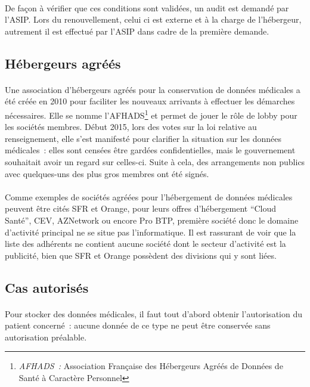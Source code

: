 \paragraph{}
De façon à vérifier que ces conditions sont validées, un audit est demandé par
l'ASIP\@. Lors du renouvellement, celui ci est externe et à la charge de
l'hébergeur, autrement il est effectué par l'ASIP dans cadre de la première
demande.


        \subsection{Hébergeurs agréés}

\paragraph{}
Une association d'hébergeurs agréés pour la conservation de données médicales a
été créée en 2010 pour faciliter les nouveaux arrivants à effectuer les
démarches nécessaires. Elle se nomme l'AFHADS\footnote{\emph{AFHADS~: }
Association Française des Hébergeurs Agréés de Données de Santé à Caractère
Personnel} et permet de jouer le rôle de lobby pour les sociétés membres. Début
2015, lors des votes sur la loi relative au renseignement, elle s'est manifesté
pour clarifier la situation sur les données médicales~: elles sont censées être
gardées confidentielles, mais le gouvernement souhaitait avoir un regard sur
celles-ci. Suite à cela, des arrangements non publics avec quelques-uns des
plus gros membres ont été signés.

\paragraph{}
Comme exemples de sociétés agréées pour l'hébergement de données médicales
peuvent être cités SFR et Orange, pour leurs offres d'hébergement ``Cloud
Santé'', CEV, AZNetwork ou encore Pro BTP, première société donc le domaine
d'activité principal ne se situe pas l'informatique. Il est rassurant de voir
que la liste des adhérents ne contient aucune société dont le secteur
d'activité est la publicité, bien que SFR et Orange possèdent des divisions qui
y sont liées.

        \subsection{Cas autorisés}

\paragraph{}
Pour stocker des données médicales, il faut tout d'abord obtenir l'autorisation
du patient concerné~: aucune donnée de ce type ne peut être conservée sans
autorisation préalable.

